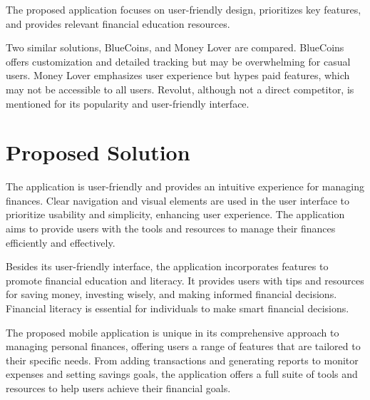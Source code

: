 \hspace{\parindent}The proposed application focuses on user-friendly design, prioritizes key features, and provides relevant financial education resources.

\hspace{\parindent}Two similar solutions, BlueCoins, and Money Lover are compared. BlueCoins offers customization and detailed tracking but may be overwhelming for casual users. Money Lover emphasizes user experience but hypes paid features, which may not be accessible to all users. Revolut, although not a direct competitor, is mentioned for its popularity and user-friendly interface.



\newpage
\section{Proposed Solution}\label{sect: Motivation}
\hspace{\parindent} The application is user-friendly and provides an intuitive experience for managing finances. Clear navigation and visual elements are used in the user interface to prioritize usability and simplicity, enhancing user experience. The application aims to provide users with the tools and resources to manage their finances efficiently and effectively.

\hspace{\parindent}Besides its user-friendly interface, the application incorporates features to promote financial education and literacy. It provides users with tips and resources for saving money, investing wisely, and making informed financial decisions. Financial literacy is essential for individuals to make smart financial decisions.

\hspace{\parindent}The proposed mobile application is unique in its comprehensive approach to managing personal finances, offering users a range of features that are tailored to their specific needs. From adding transactions and generating reports to monitor expenses and setting savings goals, the application offers a full suite of tools and resources to help users achieve their financial goals.

